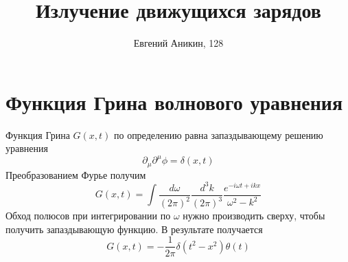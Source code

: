 \documentclass{article}
\title{Излучение движущихся зарядов}
\author{Евгений Аникин, 128}
\begin{document}
\maketitle
\section{Функция Грина волнового уравнения}
Функция Грина $G(x,t)$ по определению равна запаздывающему решению уравнения
\begin{equation}
    \partial_\mu \partial^\mu \phi = \delta(x,t)
\end{equation}
Преобразованием Фурье получим
\begin{equation}
    G(x,t) = \int \frac{d\omega}{(2\pi)^2} \frac{d^3k}{(2\pi)^3} 
            \frac{e^{-i\omega t + ikx}}{\omega^2 - k^2}
\end{equation}
Обход полюсов при интегрировании по $\omega$ нужно производить сверху, чтобы получить
запаздывающую функцию.
В результате получается
\begin{equation}
    G(x,t) = -\frac{1}{2\pi} \delta(t^2 - x^2) \theta(t)
\end{equation}
\end{document}
